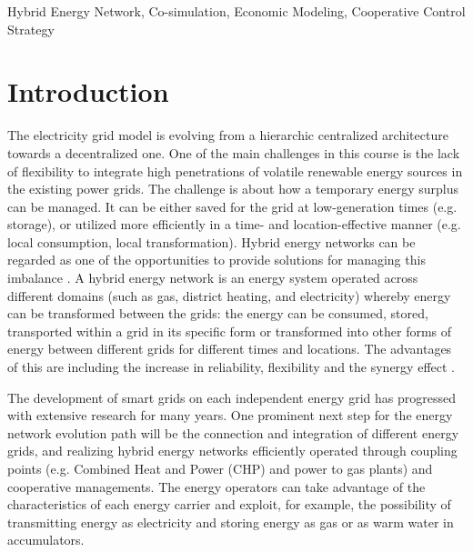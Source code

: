 \documentclass[review]{elsarticle}
\begin{document}
\begin{frontmatter}
\begin{keyword}
Hybrid Energy Network, Co-simulation, Economic Modeling, 
Cooperative Control Strategy
\end{keyword}
\end{frontmatter}

\linenumbers

\section{Introduction}

The electricity grid model is evolving from a hierarchic centralized
architecture towards a decentralized one. One of the main challenges 
in this course is the lack of flexibility to integrate high
penetrations of volatile renewable energy sources in the existing
power grids.  
The challenge is about how a temporary energy surplus can be
managed. It can be either saved for the grid at low-generation 
times (e.g. storage), or utilized more efficiently in a time- and
location-effective manner (e.g. local consumption, local
transformation).   
Hybrid energy networks can be regarded as one of the opportunities to  
provide solutions for managing this imbalance \cite{appelrath_2012}.  
A hybrid energy network is an energy system operated across
different domains (such as gas, district heating, and electricity)
whereby energy can be transformed between the grids: the energy can be
consumed, stored, transported within a grid in its specific form or
transformed into other forms of energy between different grids for
different times and locations. 
The advantages of this are including the increase in reliability,
flexibility and the synergy effect \cite{arnold_2011}.

The development of smart grids on each independent energy grid has
progressed with extensive research for many years. One prominent next
step for the energy network evolution path will be the connection and
integration of different energy grids, and realizing hybrid energy
networks efficiently operated through coupling points (e.g. Combined
Heat and Power (CHP) and power to gas plants) and cooperative
managements. 
The energy operators can take advantage of the characteristics of each  
energy carrier and exploit, for example, the possibility of
transmitting energy as electricity and storing energy as gas or as 
warm water in accumulators.  
\end{document}
